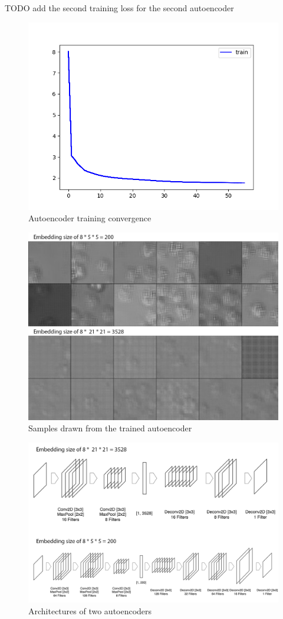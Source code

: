 TODO add the second training loss for the second autoencoder
\begin{figure}[htb]
	\begin{center}
		\includegraphics[width=0.5\linewidth]{bilder/ae-embeddings/training-ae-.png}
		\caption{Autoencoder training convergence}\label{fig:ae-training}
	\end{center}
\end{figure}

\begin{figure}[htb]
	\begin{center}
		\includegraphics[width=0.5\linewidth]{bilder/ae-embeddings/ae-samples.png}
		\caption{Samples drawn from the trained autoencoder}\label{fig:ae-samples}
	\end{center}
\end{figure}

\begin{figure}[htb]
	\begin{center}
		\includegraphics[width=0.5\linewidth]{bilder/ae-embeddings/ae-architecture.png}
		\caption{Architectures of two autoencoders}\label{fig:ae-architecture}
	\end{center}
\end{figure}

